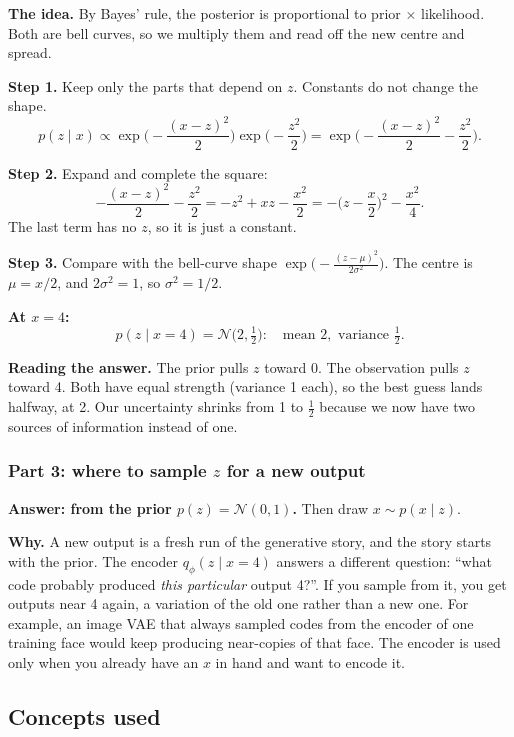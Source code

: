 \documentclass[12pt,a4paper]{article}
\begin{document}
\textbf{The idea.} By Bayes' rule, the posterior is proportional to prior $\times$ likelihood. Both are bell curves, so we multiply them and read off the new centre and spread.

\textbf{Step 1.} Keep only the parts that depend on $z$. Constants do not change the shape.
\[
p(z \mid x) \propto \exp\!\Big(-\frac{(x-z)^2}{2}\Big)\exp\!\Big(-\frac{z^2}{2}\Big) = \exp\!\Big(-\frac{(x-z)^2}{2} - \frac{z^2}{2}\Big).
\]

\textbf{Step 2.} Expand and complete the square:
\[
-\frac{(x-z)^2}{2} - \frac{z^2}{2} = -z^2 + xz - \frac{x^2}{2} = -\Big(z - \frac{x}{2}\Big)^2 - \frac{x^2}{4}.
\]
The last term has no $z$, so it is just a constant.

\textbf{Step 3.} Compare with the bell-curve shape $\exp\!\big(-\frac{(z-\mu)^2}{2\sigma^2}\big)$. The centre is $\mu = x/2$, and $2\sigma^2 = 1$, so $\sigma^2 = 1/2$.

\textbf{At $x = 4$:}
\[
p(z \mid x = 4) = \mathcal{N}\big(2, \tfrac{1}{2}\big): \quad \text{mean } 2, \text{ variance } \tfrac{1}{2}.
\]

\textbf{Reading the answer.} The prior pulls $z$ toward 0. The observation pulls $z$ toward 4. Both have equal strength (variance 1 each), so the best guess lands halfway, at 2. Our uncertainty shrinks from 1 to $\tfrac12$ because we now have two sources of information instead of one.

\subsubsection{Part 3: where to sample $z$ for a new output}

\textbf{Answer: from the prior $p(z) = \mathcal{N}(0,1)$.} Then draw $x \sim p(x \mid z)$.

\textbf{Why.} A new output is a fresh run of the generative story, and the story starts with the prior. The encoder $q_\phi(z \mid x = 4)$ answers a different question: ``what code probably produced \emph{this particular} output 4?''. If you sample from it, you get outputs near 4 again, a variation of the old one rather than a new one. For example, an image VAE that always sampled codes from the encoder of one training face would keep producing near-copies of that face. The encoder is used only when you already have an $x$ in hand and want to encode it.

\subsection{Concepts used}
\end{document}
